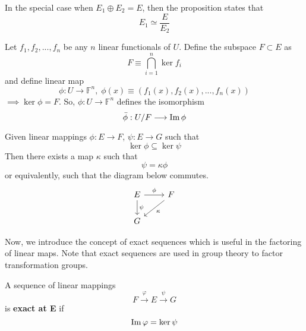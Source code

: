   \begin{corollary}
    In the special case when $E_1 \oplus E_2 = E$, then the proposition states that 
    \begin{equation}
      E_1 \simeq \frac{E}{E_2}
    \end{equation}
  \end{corollary}

  Let $f_1, f_2, ..., f_n$ be any $n$ linear functionals of $U$. Define the subspace $F \subset E$ as 
  \begin{equation}
    F \equiv \bigcap_{i=1}^n \ker{f_i}
  \end{equation}
  and define linear map 
  \begin{equation}
    \phi: U \longrightarrow \mathbb{F}^n, \;\phi(x) \equiv (f_1(x), f_2(x), ..., f_n(x))
  \end{equation}
  $\implies \ker{\phi} = F$. So, $\phi: U \longrightarrow \mathbb{F}^n$ defines the isomorphism 
  \begin{equation}
    \bar{\phi}: U / F \longrightarrow \im{\phi}
  \end{equation}

  \begin{proposition}
    Given linear mappings $\phi: E \longrightarrow F$, $\psi: E \longrightarrow G$ such that
    \begin{equation}
      \ker{\phi} \subseteq \ker{\psi}
    \end{equation}
    Then there exists a map $\kappa$ such that 
    \begin{equation}
      \psi = \kappa \phi
    \end{equation}
    or equivalently, such that the diagram below commutes. 
    \[\begin{tikzcd} 
        E \arrow{r}{\phi} \arrow{d}{\psi} & F \arrow{dl}{\kappa} \\
        G 
    \end{tikzcd}\]
  \end{proposition}

  Now, we introduce the concept of exact sequences which is useful in the factoring of linear maps. Note that exact sequences are used in group theory to factor transformation groups. 

  \begin{definition}
    A sequence of linear mappings 
    \begin{equation}
      F \xrightarrow{\varphi} E \xrightarrow{\psi} G
    \end{equation}
    is \textbf{exact at E} if
    \begin{equation}
      \im{\varphi} = \ker{\psi}
    \end{equation}
  \end{definition}


